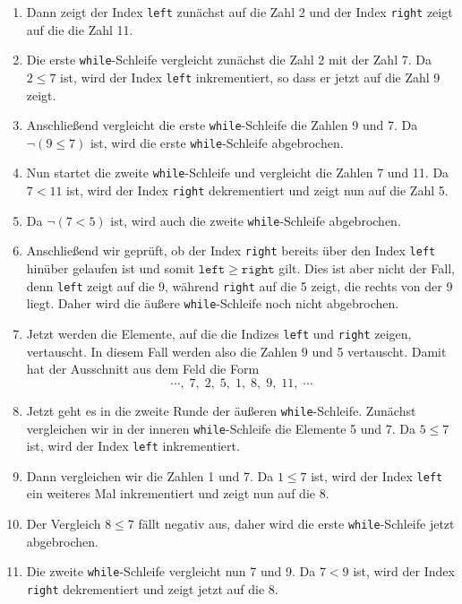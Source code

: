 \begin{enumerate}
\item Dann zeigt der Index \texttt{left} zun\"achst auf
      die Zahl 2 und der Index \texttt{right} zeigt auf die die Zahl 11.
\item Die erste \texttt{while}-Schleife vergleicht zun\"achst die Zahl 2 mit der Zahl 7.
      Da $2 \leq 7$ ist, wird der Index \texttt{left} inkrementiert, so dass er jetzt auf 
      die Zahl 9 zeigt.
\item Anschlie{\ss}end vergleicht die  erste \texttt{while}-Schleife die Zahlen 9 und 7.
      Da $\neg(9 \leq 7)$ ist, wird die erste \texttt{while}-Schleife abgebrochen.
\item Nun startet die zweite \texttt{while}-Schleife und vergleicht die Zahlen 7 und 11.
      Da $7 < 11$ ist, wird der Index \texttt{right} dekrementiert und zeigt nun auf die
      Zahl 5.
\item Da $\neg (7 < 5)$ ist, wird auch die zweite \texttt{while}-Schleife abgebrochen.
\item Anschlie{\ss}end wir gepr\"uft, ob der Index \texttt{right} bereits \"uber den Index
      \texttt{left} hin\"uber gelaufen ist und somit $\mathtt{left} \geq \mathtt{right}$
      gilt.   Dies ist aber nicht der Fall, denn \texttt{left} zeigt auf die 9,
      w\"ahrend \texttt{right} auf die 5 zeigt, die rechts von der 9 liegt.
      Daher wird die \"au{\ss}ere \texttt{while}-Schleife noch nicht abgebrochen.
\item Jetzt werden die Elemente, auf die die Indizes \texttt{left} und \texttt{right}
      zeigen, vertauscht.  In diesem Fall werden also die Zahlen 9 und 5 vertauscht.
      Damit hat der Ausschnitt aus dem Feld die Form
      \[ \cdots,\; 7,\; 2,\; 5,\; 1,\; 8,\; 9,\; 11,\;\cdots \]
\item Jetzt geht es in die zweite Runde der \"au{\ss}eren \texttt{while}-Schleife.
      Zun\"achst vergleichen wir in der inneren \texttt{while}-Schleife die Elemente
      5 und 7.  Da $5 \leq 7$ ist, wird der Index \texttt{left} inkrementiert.
\item Dann vergleichen wir die Zahlen 1 und 7.  Da $1 \leq 7$ ist, wird der Index
      \texttt{left} ein weiteres Mal inkrementiert und zeigt nun auf die 8.
\item Der Vergleich $8 \leq 7$ f\"allt negativ aus, daher wird die erste
      \texttt{while}-Schleife jetzt abgebrochen.
\item Die zweite \texttt{while}-Schleife vergleicht nun 7 und 9.  Da $7 < 9$ ist,
      wird der Index \texttt{right} dekrementiert und zeigt jetzt auf die 8.

\end{enumerate}
